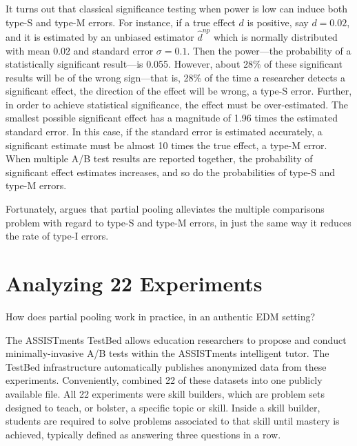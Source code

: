 \documentclass{edm_template}
\newcommand{\tauhat}{\hat{d}^{np}}
\begin{document}
It turns out that classical significance testing when power is low can induce both type-S and type-M errors. 
For instance, if a true effect $d$ is positive, say $d=0.02$, and it is estimated by an unbiased estimator $\tauhat$ which is normally distributed with mean $0.02$ and standard error $\sigma=0.1$. 
Then the power---the probability of a statistically significant result---is 0.055.
However, about 28\% of these significant results will be of the wrong sign---that is, 28\% of the time a researcher detects a significant effect, the direction of the effect will be wrong, a type-S error.
Further, in order to achieve statistical significance, the effect must be over-estimated.
The smallest possible significant effect has a magnitude of 1.96 times the estimated standard error.
In this case, if the standard error is estimated accurately, a significant estimate must be almost 10 times the true effect, a type-M error. 
When multiple A/B test results are reported together, the probability of significant effect estimates increases, and so do the probabilities of type-S and type-M errors. 

Fortunately, \cite{gelmanMultiple} argues that partial pooling alleviates the multiple comparisons problem with regard to type-S and type-M errors, in just the same way it reduces the rate of type-I errors. 

\section{Analyzing 22 Experiments}\label{sec:experiments}
How does partial pooling work in practice, in an authentic EDM setting?


The ASSISTments TestBed \cite{testbed} allows education researchers to propose and conduct minimally-invasive A/B tests within the ASSISTments intelligent tutor. The TestBed infrastructure automatically publishes anonymized data from these experiments.
Conveniently, \cite{data} combined 22 of these datasets into one publicly available file.
All 22 experiments were skill builders, which are problem sets designed to teach, or bolster, a specific topic or skill.
Inside a skill builder, students are required to solve problems associated to that skill until mastery is achieved, typically defined as answering three questions in a row. 
\end{document}
